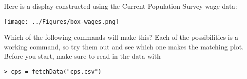 
Here is a display constructed using the Current Population Survey wage data:

\centerline{\texttt{[image: ../Figures/box-wages.png]}}

Which of the following commands will make this? Each of the
possibilities is a working command, so try them out and see which one
makes the matching plot.  Before you start, make sure to read in the
data with 
\begin{verbatim}
> cps = fetchData("cps.csv")
\end{verbatim}

\begin{MultipleChoice}
\end{MultipleChoice}

